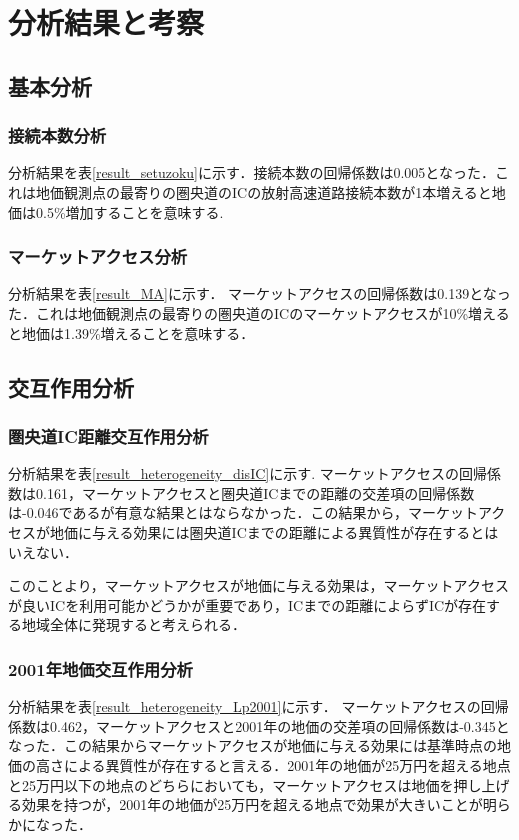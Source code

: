 \chapter{分析結果と考察}
\section{基本分析}
\subsection{接続本数分析}
分析結果を表\ref{result_setuzoku}に示す．接続本数の回帰係数は0.005となった．これは地価観測点の最寄りの圏央道のICの放射高速道路接続本数が1本増えると地価は0.5\%増加することを意味する.

\subsection{マーケットアクセス分析}
分析結果を表\ref{result_MA}に示す．
マーケットアクセスの回帰係数は0.139となった．これは地価観測点の最寄りの圏央道のICのマーケットアクセスが10\%増えると地価は1.39\%増えることを意味する．

\section{交互作用分析}


\subsection{圏央道IC距離交互作用分析}
分析結果を表\ref{result_heterogeneity_disIC}に示す.
マーケットアクセスの回帰係数は0.161，マーケットアクセスと圏央道ICまでの距離の交差項の回帰係数は-0.046であるが有意な結果とはならなかった．この結果から，マーケットアクセスが地価に与える効果には圏央道ICまでの距離による異質性が存在するとはいえない．

このことより，マーケットアクセスが地価に与える効果は，マーケットアクセスが良いICを利用可能かどうかが重要であり，ICまでの距離によらずICが存在する地域全体に発現すると考えられる．
\subsection{2001年地価交互作用分析}
分析結果を表\ref{result_heterogeneity_Lp2001}に示す．
マーケットアクセスの回帰係数は0.462，マーケットアクセスと2001年の地価の交差項の回帰係数は-0.345となった．この結果からマーケットアクセスが地価に与える効果には基準時点の地価の高さによる異質性が存在すると言える．2001年の地価が25万円を超える地点と25万円以下の地点のどちらにおいても，マーケットアクセスは地価を押し上げる効果を持つが，2001年の地価が25万円を超える地点で効果が大きいことが明らかになった．

